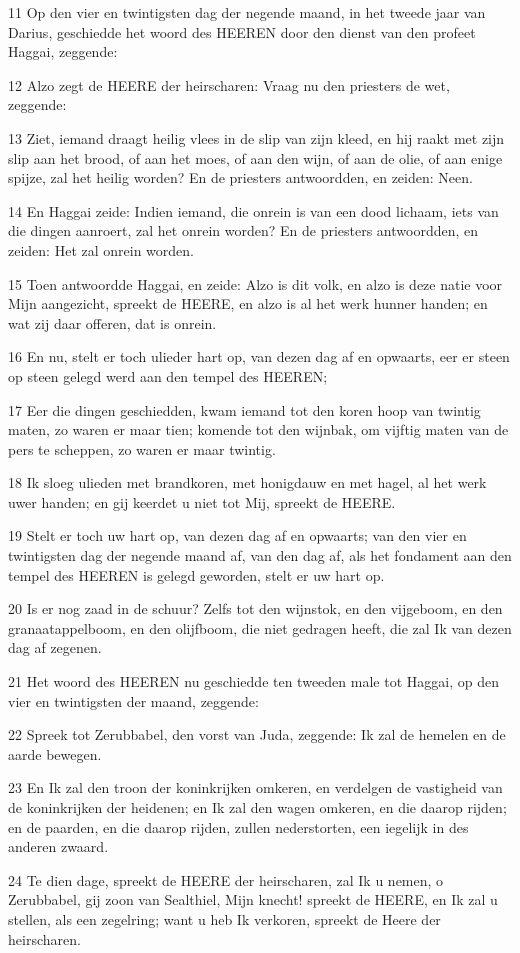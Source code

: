 \par 11 Op den vier en twintigsten dag der negende maand, in het tweede jaar van Darius, geschiedde het woord des HEEREN door den dienst van den profeet Haggai, zeggende:
\par 12 Alzo zegt de HEERE der heirscharen: Vraag nu den priesters de wet, zeggende:
\par 13 Ziet, iemand draagt heilig vlees in de slip van zijn kleed, en hij raakt met zijn slip aan het brood, of aan het moes, of aan den wijn, of aan de olie, of aan enige spijze, zal het heilig worden? En de priesters antwoordden, en zeiden: Neen.
\par 14 En Haggai zeide: Indien iemand, die onrein is van een dood lichaam, iets van die dingen aanroert, zal het onrein worden? En de priesters antwoordden, en zeiden: Het zal onrein worden.
\par 15 Toen antwoordde Haggai, en zeide: Alzo is dit volk, en alzo is deze natie voor Mijn aangezicht, spreekt de HEERE, en alzo is al het werk hunner handen; en wat zij daar offeren, dat is onrein.
\par 16 En nu, stelt er toch ulieder hart op, van dezen dag af en opwaarts, eer er steen op steen gelegd werd aan den tempel des HEEREN;
\par 17 Eer die dingen geschiedden, kwam iemand tot den koren hoop van twintig maten, zo waren er maar tien; komende tot den wijnbak, om vijftig maten van de pers te scheppen, zo waren er maar twintig.
\par 18 Ik sloeg ulieden met brandkoren, met honigdauw en met hagel, al het werk uwer handen; en gij keerdet u niet tot Mij, spreekt de HEERE.
\par 19 Stelt er toch uw hart op, van dezen dag af en opwaarts; van den vier en twintigsten dag der negende maand af, van den dag af, als het fondament aan den tempel des HEEREN is gelegd geworden, stelt er uw hart op.
\par 20 Is er nog zaad in de schuur? Zelfs tot den wijnstok, en den vijgeboom, en den granaatappelboom, en den olijfboom, die niet gedragen heeft, die zal Ik van dezen dag af zegenen.
\par 21 Het woord des HEEREN nu geschiedde ten tweeden male tot Haggai, op den vier en twintigsten der maand, zeggende:
\par 22 Spreek tot Zerubbabel, den vorst van Juda, zeggende: Ik zal de hemelen en de aarde bewegen.
\par 23 En Ik zal den troon der koninkrijken omkeren, en verdelgen de vastigheid van de koninkrijken der heidenen; en Ik zal den wagen omkeren, en die daarop rijden; en de paarden, en die daarop rijden, zullen nederstorten, een iegelijk in des anderen zwaard.
\par 24 Te dien dage, spreekt de HEERE der heirscharen, zal Ik u nemen, o Zerubbabel, gij zoon van Sealthiel, Mijn knecht! spreekt de HEERE, en Ik zal u stellen, als een zegelring; want u heb Ik verkoren, spreekt de Heere der heirscharen.



